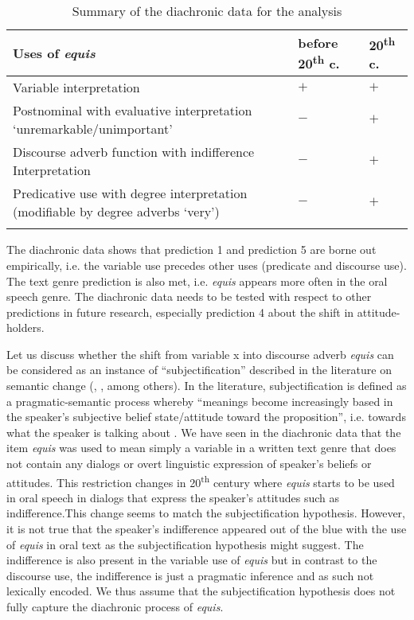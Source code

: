 \documentclass[output=paper
,modfonts
,nonflat]{langsci/langscibook}
\begin{document}
\begin{table}\small
\caption{Summary of the diachronic data for the analysis}
\label{tab:4:Summary}
\setlength{\tabcolsep}{8pt}
 \begin{tabular}{p{4cm} p{2cm} p{2cm}}
  \lsptoprule
    Uses of \textit{equis} & \textbf{before 20}\textsuperscript{th} \textbf{c.} & \textbf{20}\textsuperscript{th} \textbf{c.}\\ 
  \toprule
   \raggedright Variable interpretation & $+$\cellcolor[gray]{0.5} & $+$\cellcolor[gray]{0.5}\\
  \midrule
   \raggedright Postnominal with evaluative interpretation ‘unremarkable/unimportant’ & $-$ & $+$\cellcolor[gray]{0.5}\\
  \midrule
   \raggedright Discourse adverb function with  indifference Interpretation & $-$ & $+$\cellcolor[gray]{0.5}\\
  \midrule
   \raggedright Predicative use with degree interpretation (modifiable by degree adverbs ‘very’) & $-$ & $+$\cellcolor[gray]{0.5}\\
  \lspbottomrule
 \end{tabular}
\end{table}

The diachronic data shows that prediction 1 and prediction 5 are borne out empirically, i.e. the variable use precedes other uses (predicate and discourse use). The text genre prediction is also met, i.e. \textit{equis} appears more often in the oral speech genre. The diachronic data needs to be tested with respect to other predictions in future research, especially prediction 4 about the shift in attitude-holders. 
 
Let us discuss whether the shift from variable x into discourse adverb \textit{equis} can be considered as an instance of “subjectification” described in the literature on semantic change (\citealt{Traugott1995}, \citealt{Company2003}, among others). In the literature, subjectification is defined as a pragmatic-semantic process whereby “meanings become increasingly based in the speaker’s subjective belief state/attitude toward the proposition”, i.e. towards what the speaker is talking about \citep[31]{Traugott1995}. We have seen in the diachronic data that the item \textit{equis} was used to mean simply a variable in a written text genre that does not contain any dialogs or overt linguistic expression of speaker’s beliefs or attitudes. This restriction changes in 20\textsuperscript{th} century where \textit{equis} starts to be used in oral speech in dialogs that express the speaker’s attitudes such as indifference.This change seems to match the subjectification hypothesis. However, it is not true that the speaker’s indifference appeared out of the blue with the use of \textit{equis} in oral text as the subjectification hypothesis might suggest. The indifference is also present in the variable use of \textit{equis} but in contrast to the discourse use, the indifference is just a pragmatic inference and as such not lexically encoded. We thus assume that the subjectification hypothesis does not fully capture the diachronic process of \textit{equis}.
\end{document}
